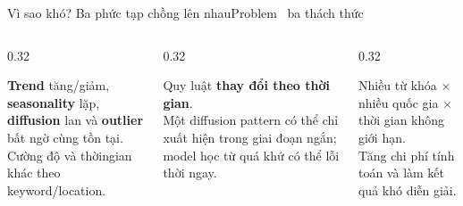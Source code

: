 \documentclass[aspectratio=169,11pt]{beamer}
\begin{document}
\begin{frame}[shrink=25]{Vì sao khó? Ba phức tạp chồng lên nhau}{Problem \textperiodcentered\ ba thách thức}
\begin{columns}[T,onlytextwidth]
\begin{column}{0.32\textwidth}
\begin{intuition}
  \textbf{Trend} tăng/giảm, \textbf{seasonality} lặp, \textbf{diffusion} lan và \textbf{outlier} bất ngờ cùng tồn tại.\\[2mm]
  {\small Cường độ và thờingian khác theo keyword/location.}
\end{intuition}
\end{column}
\begin{column}{0.32\textwidth}
\begin{mathcard}
  Quy luật \textbf{thay đổi theo thời gian}.\\[2mm]
  Một diffusion pattern có thể chỉ xuất hiện trong giai đoạn ngắn; model học từ quá khứ có thể lỗi thời ngay.
\end{mathcard}
\end{column}
\begin{column}{0.32\textwidth}
\begin{caution}
  Nhiều từ khóa × nhiều quốc gia × thời gian không giới hạn.\\[2mm]
  Tăng chi phí tính toán và làm kết quả khó diễn giải.
\end{caution}
\end{column}
\end{columns}
\vspace{5mm}
\centering
{}
\vspace{2mm}
\end{frame}
\end{document}
